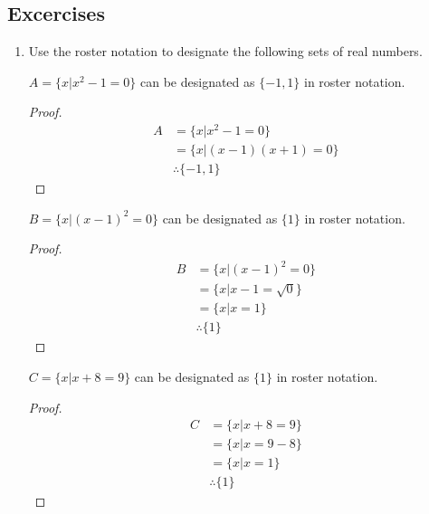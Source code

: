 \subsection{Excercises}

\begin{enumerate}
  \item Use the roster notation to designate the following sets of real numbers.
  
  \begin{proposition}
    $A = \{ x | x^2 - 1 = 0\}$ can be designated as $\{-1, 1\}$ in roster notation.
  \end{proposition}
  \begin{proof}
    \begin{equation}
      \begin{split}
        A & = \{x | x^2 - 1 = 0\} \\
        & = \{x | (x - 1)(x + 1) = 0\} \\
        & \therefore \{-1, 1\}
      \end{split}
    \end{equation}
  \end{proof}

  \begin{proposition}
    $B = \{x | (x-1)^2 = 0\}$ can be designated as $\{1\}$ in roster notation.
  \end{proposition}
  \begin{proof}
    \begin{equation}
      \begin{split}
        B & = \{x | (x-1)^2 = 0\} \\
        & = \{x | x-1 = \sqrt{0} \} \\
        & = \{x | x = 1 \} \\
        & \therefore \{1\}
      \end{split}
    \end{equation}
  \end{proof}

  \begin{proposition}
    $C = \{x | x + 8 = 9\}$ can be designated as $\{ 1 \}$ in roster notation.
  \end{proposition}
  \begin{proof}
    \begin{equation}
      \begin{split}
        C & = \{x | x + 8 = 9\} \\
        & = \{x | x = 9 - 8 \} \\
        & = \{x | x = 1 \} \\
        & \therefore \{ 1 \}
      \end{split}
    \end{equation}
  \end{proof}


\end{enumerate}
